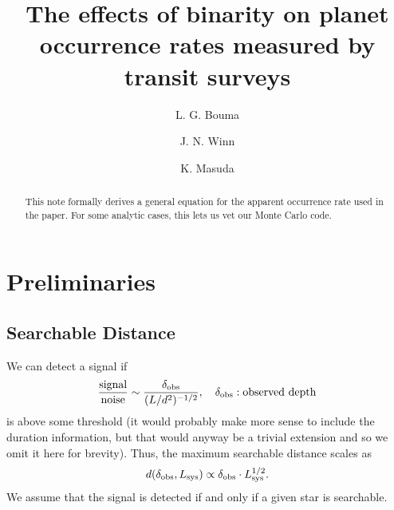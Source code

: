\documentclass[12pt,modern]{aastex61}
\begin{document}
    
\title{ The effects of binarity on planet occurrence rates measured by transit 
surveys}
%
%
\author{L. G. Bouma}
\author{J. N. Winn}
\author{K. Masuda}
%
%
\begin{abstract}
%
This note formally derives a general equation for the apparent occurrence rate 
used in the paper.
For some analytic cases, this lets us vet our Monte Carlo code.

%
\end{abstract}
%
%
%

\newcommand{\pt}{\theta}
\newcommand{\pa}{\theta_{\rm a}}
\newcommand{\pn}{\theta_0}

\newcommand{\pp}{\mathcal{P}}
\newcommand{\ps}{\mathcal{S}}
\renewcommand{\a}{_{\rm a}}
\newcommand{\s}{_{\rm s}}

\section{Preliminaries}

\subsection{Searchable Distance}

We can detect a signal if 
\begin{equation}
	{\text{signal}\over\text{noise}}\sim
    {\delta_{\rm obs}\over(L/d^2)^{-1/2}},
	\quad \delta_{\rm obs}:\text{observed depth}
    \label{eq:snr_limited}
\end{equation}
is above some threshold (it would probably make more sense to include the 
duration information, but that would anyway be a trivial extension and so we 
omit it here for brevity). Thus, the maximum searchable distance scales as
\begin{equation}
	d(\delta_{\rm obs}, L_{\rm sys}) \propto \delta_{\rm obs} \cdot L_{\rm 
	sys}^{1/2}.
\end{equation}
We assume that the signal is detected if and only if a given star is searchable. 
\end{document}
